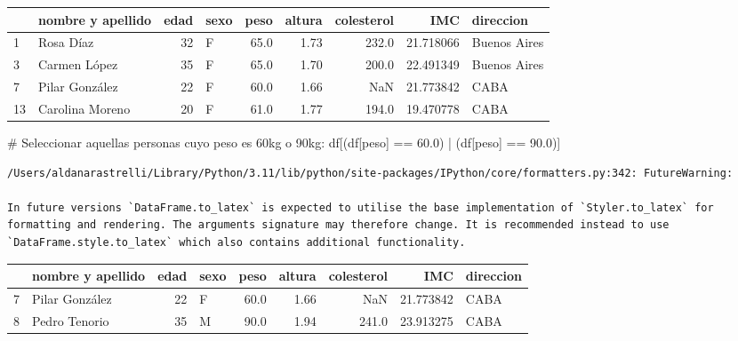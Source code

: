 \documentclass[
  letterpaper,
  DIV=11,
  numbers=noendperiod]{scrreprt}
\newenvironment{Shaded}{\begin{snugshade}}{\end{snugshade}}
\newcommand{\CommentTok}[1]{\textcolor[rgb]{0.37,0.37,0.37}{#1}}
\newcommand{\FloatTok}[1]{\textcolor[rgb]{0.68,0.00,0.00}{#1}}
\newcommand{\NormalTok}[1]{\textcolor[rgb]{0.00,0.23,0.31}{#1}}
\newcommand{\OperatorTok}[1]{\textcolor[rgb]{0.37,0.37,0.37}{#1}}
\newcommand{\StringTok}[1]{\textcolor[rgb]{0.13,0.47,0.30}{#1}}
\begin{document}
\begin{tabular}{llrlrrrrl}
\toprule
{} & nombre y apellido &  edad & sexo &  peso &  altura &  colesterol &        IMC &     direccion \\
\midrule
1  &         Rosa Díaz &    32 &    F &  65.0 &    1.73 &       232.0 &  21.718066 &  Buenos Aires \\
3  &      Carmen López &    35 &    F &  65.0 &    1.70 &       200.0 &  22.491349 &  Buenos Aires \\
7  &    Pilar González &    22 &    F &  60.0 &    1.66 &         NaN &  21.773842 &          CABA \\
13 &   Carolina Moreno &    20 &    F &  61.0 &    1.77 &       194.0 &  19.470778 &          CABA \\
\bottomrule
\end{tabular}

\begin{Shaded}
\begin{Highlighting}[]
\CommentTok{\# Seleccionar aquellas personas cuyo peso es 60kg o 90kg:}
\NormalTok{df[(df[}\StringTok{\textquotesingle{}peso\textquotesingle{}}\NormalTok{] }\OperatorTok{==} \FloatTok{60.0}\NormalTok{) }\OperatorTok{|}\NormalTok{ (df[}\StringTok{\textquotesingle{}peso\textquotesingle{}}\NormalTok{] }\OperatorTok{==} \FloatTok{90.0}\NormalTok{)]}
\end{Highlighting}
\end{Shaded}

\begin{verbatim}
/Users/aldanarastrelli/Library/Python/3.11/lib/python/site-packages/IPython/core/formatters.py:342: FutureWarning:

In future versions `DataFrame.to_latex` is expected to utilise the base implementation of `Styler.to_latex` for formatting and rendering. The arguments signature may therefore change. It is recommended instead to use `DataFrame.style.to_latex` which also contains additional functionality.
\end{verbatim}

\begin{tabular}{llrlrrrrl}
\toprule
{} & nombre y apellido &  edad & sexo &  peso &  altura &  colesterol &        IMC & direccion \\
\midrule
7 &    Pilar González &    22 &    F &  60.0 &    1.66 &         NaN &  21.773842 &      CABA \\
8 &     Pedro Tenorio &    35 &    M &  90.0 &    1.94 &       241.0 &  23.913275 &      CABA \\
\bottomrule
\end{tabular}
\end{document}
